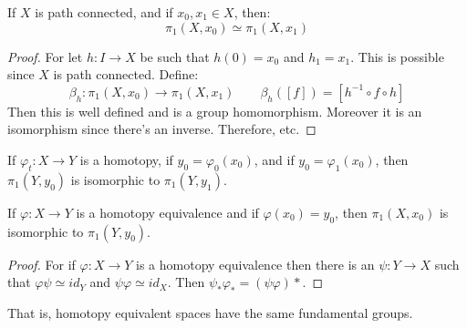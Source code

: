 \documentclass{book}                                                           %
\begin{document}
        \begin{theorem}
            If $X$ is path connected, and if $x_{0},x_{1}\in{X}$,
            then:
            \begin{equation}
                \pi_{1}(X,x_{0})\simeq\pi_{1}(X,x_{1})
            \end{equation}
        \end{theorem}
        \begin{proof}
            For let $h:I\rightarrow{X}$ be such that
            $h(0)=x_{0}$ and $h_{1}=x_{1}$. This is possible
            since $X$ is path connected. Define:
            \begin{equation}
                \beta_{h}:\pi_{1}(X,x_{0})\rightarrow
                \pi_{1}(X,x_{1})\quad\quad
                \beta_{h}([f])=[h^{\minus{1}}\circ{f}\circ{h}]
            \end{equation}
            Then this is well defined and is a group homomorphism.
            Moreover it is an isomorphism since there's an
            inverse. Therefore, etc.
        \end{proof}
        \begin{theorem}
            If $\varphi_{t}:X\rightarrow{Y}$ is a homotopy,
            if $y_{0}=\varphi_{0}(x_{0})$, and if
            $y_{0}=\varphi_{1}(x_{0})$, then
            $\pi_{1}(Y,y_{0})$ is isomorphic to
            $\pi_{1}(Y,y_{1})$.
        \end{theorem}
        \begin{theorem}
            If $\varphi:X\rightarrow{Y}$ is a homotopy
            equivalence and if $\varphi(x_{0})=y_{0}$, then
            $\pi_{1}(X,x_{0})$ is isomorphic to
            $\pi_{1}(Y,y_{0})$.
        \end{theorem}
        \begin{proof}
            For if $\varphi:X\rightarrow{Y}$ is a homotopy
            equivalence then there is an
            $\psi:Y\rightarrow{X}$ such that
            $\varphi\psi\simeq id_{Y}$ and
            $\psi\varphi\simeq id_{X}$. Then
            $\psi_{*}\varphi_{*}=(\psi\varphi){*}$.
        \end{proof}
        That is, homotopy equivalent spaces have the same
        fundamental groups.

            \par\hfill\par
    \clearpage
    
    

    \clearpage
    \printindex
\end{document}
